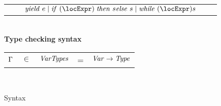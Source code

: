 \begin{figure}
\begin{tabular}{rclcl}
                  & & $\yield{e} \mid \ite{\locExpr}{s}{s} \mid \while{\locExpr}{s}$ \\ 
\end{tabular}\\
{\bf Type checking syntax} \\
\begin{tabular}{rclcl}
$\Gamma$ & $\in$ & $\mathit{VarTypes}$ & = & $\mathit{Var}\rightarrow\mathit{Type}$ \\
\end{tabular} \\
\setlength{\tabcolsep}{6pt}
\caption{Syntax}
\label{fig:syntax}
\end{figure}


